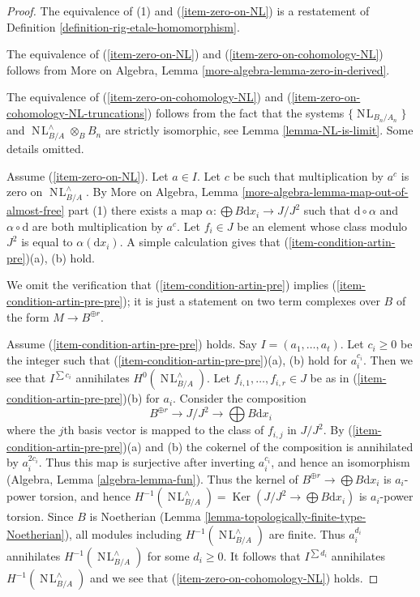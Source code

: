 \documentclass{stacks-project}
\theoremstyle{plain}
\theoremstyle{definition}
\theoremstyle{remark}
\numberwithin{equation}{subsection}
\def\NL{\mathop{N\!L}\nolimits}
\def\Ker{\mathop{\mathrm{Ker}}}
\begin{document}
\begin{proof}
The equivalence of (1) and (\ref{item-zero-on-NL}) is a restatement of
Definition \ref{definition-rig-etale-homomorphism}.

\medskip\noindent
The equivalence of (\ref{item-zero-on-NL}) and
(\ref{item-zero-on-cohomology-NL}) follows from
More on Algebra, Lemma \ref{more-algebra-lemma-zero-in-derived}.

\medskip\noindent
The equivalence of (\ref{item-zero-on-cohomology-NL})
and (\ref{item-zero-on-cohomology-NL-truncations}) follows from the fact that
the systems $\{\NL_{B_n/A_n}\}$ and $\NL_{B/A}^\wedge \otimes_B B_n$
are strictly isomorphic, see Lemma \ref{lemma-NL-is-limit}.
Some details omitted.

\medskip\noindent
Assume (\ref{item-zero-on-NL}). Let $a \in I$.
Let $c$ be such that multiplication by $a^c$ is zero on $\NL_{B/A}^\wedge$. By
More on Algebra, Lemma \ref{more-algebra-lemma-map-out-of-almost-free}
part (1) there exists a map $\alpha : \bigoplus B\text{d}x_i \to J/J^2$
such that $\text{d} \circ \alpha$ and $\alpha \circ \text{d}$ are both
multiplication by $a^c$. Let $f_i \in J$ be an element whose
class modulo $J^2$ is equal to $\alpha(\text{d}x_i)$.
A simple calculation gives that (\ref{item-condition-artin-pre})(a), (b) hold.

\medskip\noindent
We omit the verification that (\ref{item-condition-artin-pre})
implies (\ref{item-condition-artin-pre-pre}); it is just a statement
on two term complexes over $B$ of the form $M \to B^{\oplus r}$.

\medskip\noindent
Assume (\ref{item-condition-artin-pre-pre}) holds.
Say $I = (a_1, \ldots, a_t)$. Let $c_i \geq 0$ be the integer such that
(\ref{item-condition-artin-pre-pre})(a), (b)
hold for $a_i^{c_i}$. Then we see that $I^{\sum c_i}$ annihilates
$H^0(\NL_{B/A}^\wedge)$. Let $f_{i, 1}, \ldots, f_{i, r} \in J$
be as in (\ref{item-condition-artin-pre-pre})(b) for $a_i$.
Consider the composition
$$
B^{\oplus r} \to J/J^2 \to \bigoplus B\text{d}x_i
$$
where the $j$th basis vector is mapped to the class of $f_{i, j}$ in $J/J^2$.
By (\ref{item-condition-artin-pre-pre})(a) and (b) the cokernel of the
composition is annihilated by $a_i^{2c_i}$. Thus this map is surjective
after inverting $a_i^{c_i}$, and hence an isomorphism
(Algebra, Lemma \ref{algebra-lemma-fun}).
Thus the kernel of $B^{\oplus r} \to \bigoplus B\text{d}x_i$ is
$a_i$-power torsion, and hence
$H^{-1}(\NL_{B/A}^\wedge) = \Ker(J/J^2 \to \bigoplus B\text{d}x_i)$
is $a_i$-power torsion. Since $B$ is Noetherian
(Lemma \ref{lemma-topologically-finite-type-Noetherian}),
all modules including $H^{-1}(\NL_{B/A}^\wedge)$ are finite.
Thus $a_i^{d_i}$ annihilates $H^{-1}(\NL_{B/A}^\wedge)$ for some $d_i \geq 0$.
It follows that $I^{\sum d_i}$ annihilates $H^{-1}(\NL_{B/A}^\wedge)$
and we see that (\ref{item-zero-on-cohomology-NL}) holds.


\end{proof}
\end{document}
